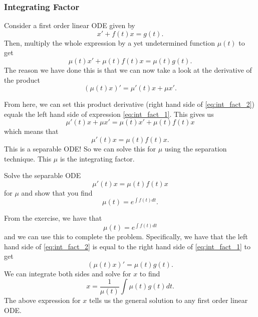         \subsubsection{Integrating Factor}
        Consider a first order linear ODE given by
        \[
        x'+f(t)x=g(t).
        \]
        Then, multiply the whole expression by a yet undetermined function $\mu(t)$ to get
        \begin{equation}
        \mu(t)x'+\mu(t)f(t)x=\mu(t)g(t). \label{eq:int_fact_1}
        \end{equation}
        The reason we have done this is that we can now take a look at the derivative of the product
        \begin{equation}
        \left( \mu(t)x\right)'= \mu'(t)x+\mu x'. \label{eq:int_fact_2}
        \end{equation}

        From here, we can set this product derivative (right hand side of \ref{eq:int_fact_2}) equals the left hand side of expression \ref{eq:int_fact_1}.  This gives us
        \[
        \mu'(t)x+\mu x' = \mu(t)x'+\mu(t) f(t) x
        \]
        which means that
        \[
        \mu'(t)x=\mu(t) f(t) x.
        \]
        This is a separable ODE! So we can solve this for $\mu$ using the separation technique. This $\mu$ is the integrating factor.
        
        \begin{exercise}
            Solve the separable ODE
            \[
            \mu'(t)x=\mu(t)f(t)x
            \]
            for $\mu$ and show that you find
            \[
            \mu(t) = e^{\int f(t)dt}.
            \]
        \end{exercise}
        
        \noindent From the exercise, we have that
        \[
        \mu(t)=e^{\int f(t)dt}
        \]
        and we can use this to complete the problem.  Specifically, we have that the left hand side of \ref{eq:int_fact_2} is equal to the right hand side of \ref{eq:int_fact_1} to get
        \[
        (\mu(t) x)' = \mu(t)g(t).
        \]
        We can integrate both sides and solve for $x$ to find
        \[
        \boxed{x = \frac{1}{\mu(t)}\int \mu(t) g(t)dt.}
        \]
        The above expression for $x$ tells us the general solution to any first order linear ODE.
        
